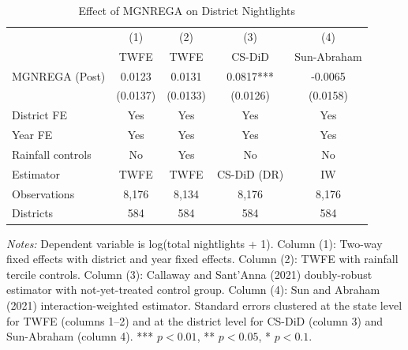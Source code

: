 \begin{table}[htbp]
\centering
\caption{Effect of MGNREGA on District Nightlights}
\label{tab:main}
\begin{tabular}{lcccc}
\hline\hline
 & (1) & (2) & (3) & (4) \\
 & TWFE & TWFE & CS-DiD & Sun-Abraham \\
\hline
MGNREGA (Post) & 0.0123 & 0.0131 & 0.0817*** & -0.0065 \\
 & (0.0137) & (0.0133) & (0.0126) & (0.0158) \\
\hline
District FE & Yes & Yes & Yes & Yes \\
Year FE & Yes & Yes & Yes & Yes \\
Rainfall controls & No & Yes & No & No \\
Estimator & TWFE & TWFE & CS-DiD (DR) & IW \\
Observations & 8,176 & 8,134 & 8,176 & 8,176 \\
Districts & 584 & 584 & 584 & 584 \\
\hline\hline
\end{tabular}
\begin{tablenotes}[flushleft]\small
\item \textit{Notes:} Dependent variable is log(total nightlights + 1). Column (1): Two-way fixed effects with district and year fixed effects. Column (2): TWFE with rainfall tercile controls. Column (3): Callaway and Sant'Anna (2021) doubly-robust estimator with not-yet-treated control group. Column (4): Sun and Abraham (2021) interaction-weighted estimator. Standard errors clustered at the state level for TWFE (columns 1--2) and at the district level for CS-DiD (column 3) and Sun-Abraham (column 4). *** $p<0.01$, ** $p<0.05$, * $p<0.1$.
\end{tablenotes}
\end{table}
